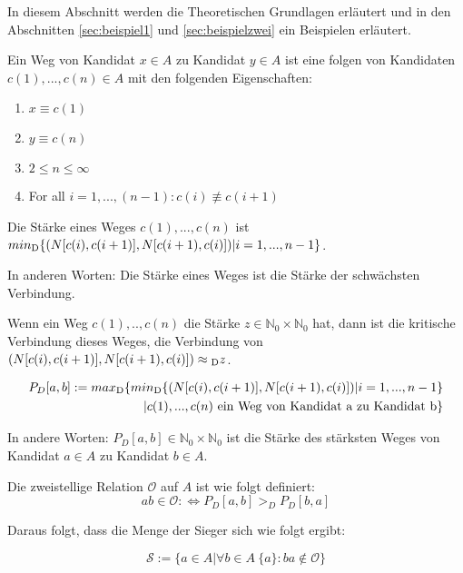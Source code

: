 In diesem Abschnitt werden die Theoretischen Grundlagen erläutert und in den Abschnitten \ref{sec:beispiel1} und  \ref{sec:beispielzwei} ein Beispielen erläutert.

\begin{defi}
Ein Weg von Kandidat $x \in A$ zu Kandidat $y \in A$ ist eine folgen von Kandidaten $c(1),...,c(n) \in A$ mit den folgenden Eigenschaften:

\begin{center}

\begin{enumerate}
\item $x \equiv c(1)$
\item $y \equiv c(n)$
\item $2 \leq n \leq \infty$
\item For all $ i = 1,...,(n-1): c(i) \not\equiv c(i+1)$
\end{enumerate}
\end{center}

Die Stärke eines Weges $c(1),...,c(n)$ ist $ min\textsubscript{D} \{(N[c(i),c(i+1)],N[c(i+1),c(i)])| i=1,...,n-1\} $.

In anderen Worten: Die Stärke eines Weges ist die Stärke der schwächsten Verbindung.

Wenn ein Weg $c(1),..,c(n)$ die Stärke $z \in  \mathbb{N}_{0} \times \mathbb{N}_{0}$ hat, dann ist die kritische Verbindung dieses Weges, die Verbindung von  $(N[c(i),c(i+1)],N[c(i+1),c(i)]) \approx \textsubscript{D}z$.

\begin{align}
P_{D}[a,b] := max\textsubscript{D}\{ min\textsubscript{D} \{(N[c(i),c(i+1)],N[c(i+1),c(i)])| i=1,...,n-1\} \nonumber \\
     |c(1),...,c(n) \text{ ein Weg von Kandidat a zu Kandidat b}\} \nonumber
\end{align}

In andere Worten: $P_{D}[a,b] \in \mathbb{N}_{0} \times \mathbb{N}_{0}$ ist die Stärke des stärksten Weges von Kandidat $a \in A$ zu Kandidat $b \in A$.

Die zweistellige Relation $\mathcal{O}$ auf $A$ ist wie folgt definiert:
\[
ab \in \mathcal{O} : \Leftrightarrow P_{D}[a,b]>_{D}P_{D}[b,a]
\]

Daraus folgt, dass die Menge der Sieger sich wie folgt ergibt:

\[
\mathcal{S} := \{ a \in A | \forall b \in A \ \{a\}: ba \not\in \mathcal{O} \}
\]


\end{defi}



